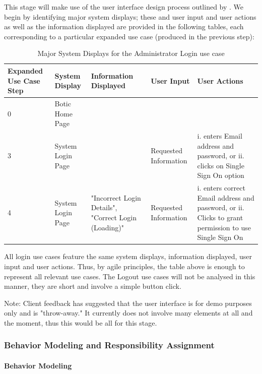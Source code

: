\documentclass[11pt]{article}
\begin{document}
This stage will make use of the user interface design process outlined by \cite{Book:1}. We begin by identifying major system displays; these and user input and user actions as well as the information displayed are provided in the following tables, each corresponding to a particular expanded use case (produced in the previous step):

\begin{table}[H]
	\centering
	\hspace*{-0.17cm}\begin{tabular}{|p{2cm}|p{3cm}|p{3cm}|p{3cm}|p{5cm}|}
		\hline
		Expanded Use Case Step & System Display & Information Displayed & User Input & User Actions \\
		\hline
		0 & Botic Home Page & & & \\
		\hline
		3 & System Login Page & & Requested Information & i. enters Email address and password, or ii. clicks on Single Sign On option \\
		\hline
		4 & System Login Page & "Incorrect Login Details", "Correct Login (Loading)" & Requested Information & i. enters correct Email address and password, or ii. Clicks to grant permission to use Single Sign On \\
		\hline
	\end{tabular}
	\caption{Major System Displays for the Administrator Login use case}
\end{table}
All login use cases feature the same system displays, information displayed, user input and user actions. Thus, by agile principles, the table above is enough to represent all relevant use cases. The Logout use cases will not be analysed in this manner, they are short and involve a simple button click.

Note: Client feedback has suggested that the user interface is for demo purposes only and is "throw-away." It currently does not involve many elements at all and the moment, thus this would be all for this stage.

\subsubsection{Behavior Modeling and Responsibility Assignment}

\paragraph{Behavior Modeling}
\end{document}
